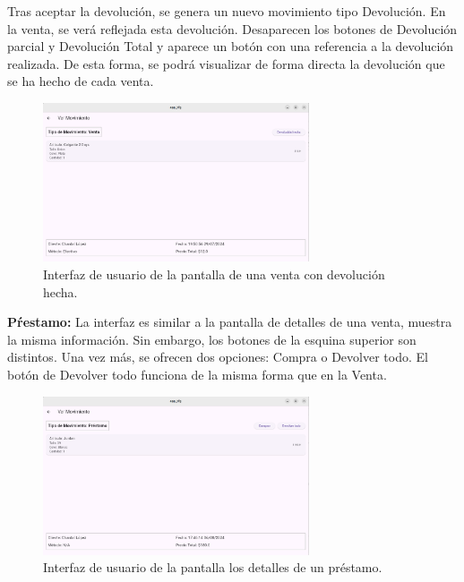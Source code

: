 Tras aceptar la devolución, se genera un nuevo movimiento tipo Devolución. En la venta, se verá reflejada esta devolución. Desaparecen los botones de Devolución parcial y Devolución Total y aparece un botón con una referencia a la devolución realizada. De esta forma, se podrá visualizar de forma directa la devolución que se ha hecho de cada venta. 

\begin{figure}[H]
	\centering
	\includegraphics[width=0.7\textwidth]{imagenes/SegundaIteracion/devolucionHechaVenta.png}
	\caption{Interfaz de usuario de la pantalla de una venta con devolución hecha.}
	\label{fig:appPantallaDevolucionHechaVenta}
\end{figure}



\textbf{Pŕestamo: } La interfaz es similar a la pantalla de detalles de una venta, muestra la misma información. Sin embargo, los botones de la esquina superior son distintos. Una vez más, se ofrecen dos opciones: Compra o Devolver todo. El botón de Devolver todo funciona de la misma forma que en la Venta. 


\begin{figure}[H]
	\centering
	\includegraphics[width=0.7\textwidth]{imagenes/SegundaIteracion/detallesPrestamo.png}
	\caption{Interfaz de usuario de la pantalla los detalles de un préstamo.}
	\label{fig:appPantallaDetallesPrestamo}
\end{figure}

